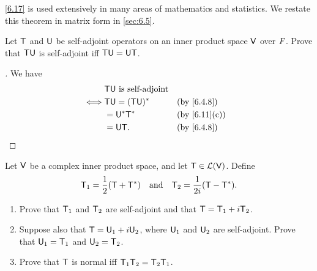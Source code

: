 \begin{note}
  \cref{6.17} is used extensively in many areas of mathematics and statistics.
  We restate this theorem in matrix form in \cref{sec:6.5}.
\end{note}

\exercisesection

\setcounter{ex}{3}
\begin{ex}\label{ex:6.4.4}
  Let \(\mathsf{T}\) and \(\mathsf{U}\) be self-adjoint operators on an inner product space \(\mathsf{V}\) over \(\mathit{F}\).
  Prove that \(\mathsf{T} \mathsf{U}\) is self-adjoint iff \(\mathsf{T} \mathsf{U} = \mathsf{U} \mathsf{T}\).
\end{ex}

\begin{proof}[]
  We have
  \begin{align*}
         & \T \U \text{ is self-adjoint}                   \\
    \iff & \T \U = (\T \U)^*             &  & \by{6.4.8}   \\
         & = \U^* \T^*                   &  & \by{6.11}[c] \\
         & = \U \T.                      &  & \by{6.4.8}
  \end{align*}
\end{proof}

\setcounter{ex}{5}
\begin{ex}\label{ex:6.4.6}
  Let \(\mathsf{V}\) be a complex inner product space, and let \(\mathsf{T} \in \mathcal{L}(\mathsf{V})\).
  Define
  \[
    \mathsf{T}_1 = \frac{1}{2} (\mathsf{T} + \mathsf{T}^*) \quad \text{and} \quad \mathsf{T}_2 = \frac{1}{2i} (\mathsf{T} - \mathsf{T}^*).
  \]
  \begin{enumerate}
    \item Prove that \(\mathsf{T}_1\) and \(\mathsf{T}_2\) are self-adjoint and that \(\mathsf{T} = \mathsf{T}_1 + i \mathsf{T}_2\).
    \item Suppose also that \(\mathsf{T} = \mathsf{U}_1 + i \mathsf{U}_2\), where \(\mathsf{U}_1\) and \(\mathsf{U}_2\) are self-adjoint.
          Prove that \(\mathsf{U}_1 = \mathsf{T}_1\) and \(\mathsf{U}_2 = \mathsf{T}_2\).
    \item Prove that \(\mathsf{T}\) is normal iff \(\mathsf{T}_1 \mathsf{T}_2 =  \mathsf{T}_2 \mathsf{T}_1\).
  \end{enumerate}
\end{ex}

